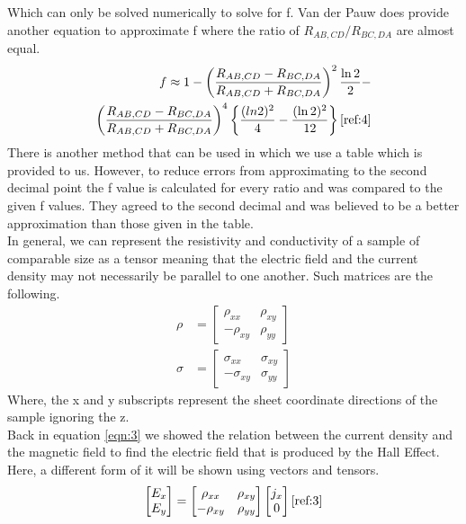 \documentclass[twocolumn]{article}
\begin{document}
Which can only be solved numerically to solve for f. Van der Pauw does provide 
another equation to approximate f where the ratio of $R_{AB,CD}/R_{BC,DA}$ are 
almost equal.
\begin{equation}
\begin{split}
f \approx 1-\left(\frac{R_{AB,CD}-R_{BC,DA}}{R_{AB,CD}+R_{BC,DA}}\right)^2\frac{\ln{2}}{2}- \\
\left(\frac{R_{AB,CD}-R_{BC,DA}}{R_{AB,CD}+R_{BC,DA}}\right)^4\left\{\frac{(ln{2})^2}{4}-\frac{(\ln{2})^2}{12}\right\}
\cite{ref:4}
\label{eqn:9}
\end{split}
\end{equation}
There is another method that can be used in which we use a table which is 
provided to us. However, to reduce errors from approximating to the second 
decimal point the f value is calculated for every ratio and was compared to the 
given f values. They agreed to the second decimal and was believed to be a 
better approximation than those given in the table.
\\
In general, we can represent the resistivity and conductivity of a sample of 
comparable size as a tensor meaning that the electric field and the current 
density may not necessarily be parallel to one another. Such matrices are the 
following.
\begin{equation*}
\begin{align*}
\rho &= 
\begin{bmatrix}
\rho_{xx}&\rho_{xy} \\
-\rho_{xy}&\rho_{yy}
\end{bmatrix}
\\
\sigma &= 
\begin{bmatrix}
\sigma_{xx}&\sigma_{xy} \\
-\sigma_{xy}&\sigma_{yy}
\end{bmatrix}
\end{align*}
\end{equation*}
Where, the x and y subscripts represent the sheet coordinate directions of the 
sample ignoring the z.
\\
Back in equation \ref{eqn:3} we showed the relation between the current density 
and the magnetic field to find the electric field that is produced by the Hall 
Effect. Here, a different form of it will be shown using vectors and tensors.
\begin{equation}
\begin{bmatrix}
E_{x}\\E_{y}
\end{bmatrix}
=
\begin{bmatrix}
\rho_{xx}&\rho_{xy} \\ 
-\rho_{xy}&\rho_{yy}
\end{bmatrix}
\begin{bmatrix}
j_x \\ 0
\end{bmatrix}
\cite{ref:3}
\label{eqn:10}
\end{equation}
\end{document}

